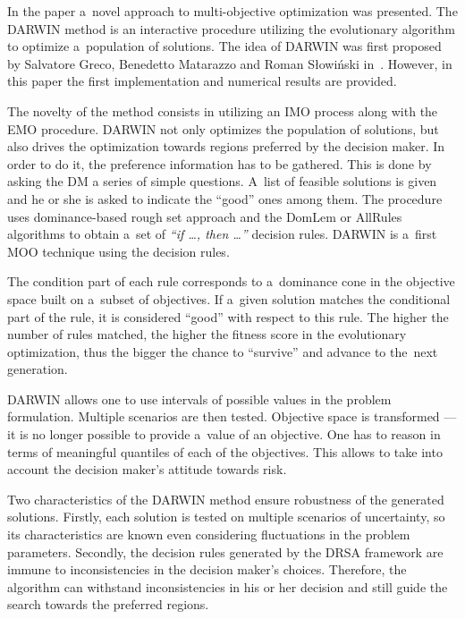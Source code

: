 In the paper a~novel approach to multi-objective optimization was
presented. The DARWIN method is an interactive procedure utilizing the
evolutionary algorithm to optimize a~population of solutions. The idea of
DARWIN was first proposed by Salvatore Greco, Benedetto Matarazzo and Roman
Słowiński in~\cite{GMS10, GMS10b, GMS10c}. However, in this paper the first
implementation and numerical results are provided.

The novelty of the method consists in utilizing an IMO process along
with the EMO procedure. DARWIN not only optimizes the population of
solutions, but also drives the optimization towards regions preferred
by the decision maker. In order to do it, the preference information
has to be gathered. This is done by asking the DM a series of simple
questions. A~list of feasible solutions is given and he or she is
asked to indicate the ``good'' ones among them. The procedure uses
dominance-based rough set approach and the DomLem or AllRules
algorithms to obtain a~set of \textit{``if \dots, then \dots''}
decision rules. DARWIN is a~first MOO technique using the decision
rules.

The condition part of each rule corresponds to a~dominance cone in the
objective space built on a~subset of objectives. If a~given solution matches
the conditional part of the rule, it is considered ``good'' with respect to
this rule. The higher the number of rules matched, the higher the fitness
score in the evolutionary optimization, thus the bigger the chance to
``survive'' and advance to the~next generation.

DARWIN allows one to use intervals of possible values in the problem
formulation. Multiple scenarios are then tested. Objective space is
transformed --- it is no longer possible to provide a~value of an
objective. One has to reason in terms of meaningful quantiles of each of the
objectives. This allows to take into account the decision maker's attitude
towards risk.

Two characteristics of the DARWIN method ensure robustness of the generated
solutions. Firstly, each solution is tested on multiple scenarios of
uncertainty, so its characteristics are known even considering fluctuations in
the problem parameters. Secondly, the decision rules generated by the DRSA
framework are immune to inconsistencies in the decision maker's
choices. Therefore, the algorithm can withstand inconsistencies in his or her
decision and still guide the search towards the preferred regions.

